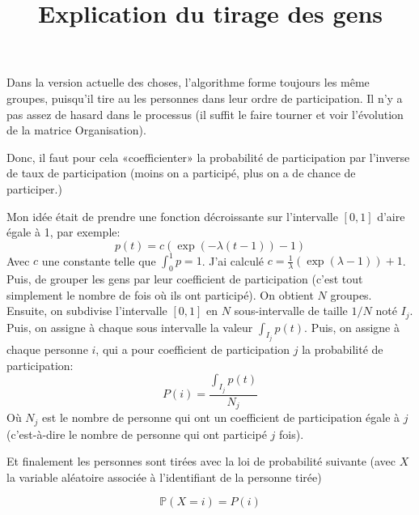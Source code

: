 \documentclass[11pt, a4paper]{article}
\title{Explication du tirage des gens}
\begin{document}

\maketitle

Dans la version actuelle des choses, l'algorithme forme toujours les même groupes, puisqu'il tire au
les personnes dans leur ordre de participation. Il n'y a pas assez de hasard dans le processus (il
suffit le faire tourner et voir l'évolution de la matrice Organisation).

Donc, il faut pour cela «coefficienter» la probabilité de participation par l'inverse de taux de
participation (moins on a participé, plus on a de chance de participer.)

Mon idée était de prendre une fonction décroissante sur l'intervalle $[0,1]$ d'aire égale à 1, par
exemple:
\[
    p(t) = c(\exp(-\lambda(t-1))-1)
    \]
Avec $c$ une constante telle que $\int_0^1 p = 1$. J'ai calculé $c = \frac{1}{\lambda}(\exp(\lambda
-1)) +1$.
Puis, de grouper les gens par leur coefficient de participation (c'est tout simplement le nombre de
fois où ils ont participé). On obtient $N$ groupes. Ensuite, on subdivise l'intervalle $[0, 1]$ en
$N$ sous-intervalle de taille $1/N$ noté $I_j$. Puis, on assigne à chaque sous intervalle la valeur
$\int_{I_j} p(t)$.
Puis, on assigne à chaque personne $i$, qui a pour coefficient de participation $j$ la probabilité de participation:
\[
    P(i)= \frac{\int_{I_j}p(t)}{N_j}
\]
Où $N_j$ est le nombre de personne qui ont un coefficient de participation égale à $j$ (c'est-à-dire
le nombre de personne qui ont participé $j$ fois).

Et finalement les personnes sont tirées avec la loi de probabilité suivante (avec $X$ la variable
aléatoire associée à l'identifiant de la personne tirée)

\[
    \mathbb{P}(X = i)= P(i)
\]
\end{document}
